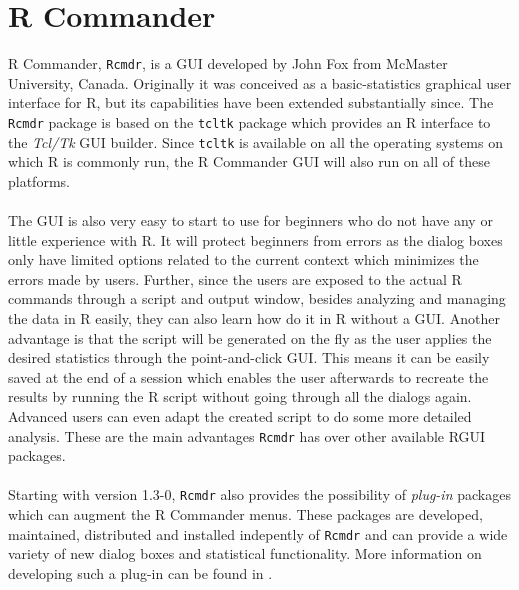 \documentclass[a4paper]{article}\usepackage[]{graphicx}\usepackage[]{color}
\begin{document}
\section{R Commander}

R Commander, \verb|Rcmdr|\citep{Fox2005}, is a GUI developed by John Fox from
McMaster University, Canada. Originally it was conceived as a basic-statistics graphical
user interface for R, but its capabilities have been extended substantially
since. The \verb|Rcmdr| package is based on the \verb|tcltk| package
\citep{Dalgaard2001} which provides an R interface to the {\it Tcl/Tk} GUI builder. 
Since \verb|tcltk| is available on all the operating systems on which R is
commonly run, the R Commander GUI will also run on all of these platforms.\\ \\
The GUI is also very easy to start to use for beginners who do not have any
or little experience with R. It will protect beginners from errors as the dialog
boxes only have limited options related to the current context which minimizes
the errors made by users. Further, since the users are exposed to the actual
R commands through a script and output window, besides analyzing and managing
the data in R easily, they can also learn how do it in R without a GUI.
Another advantage is that the script will be generated on the fly as the user
applies the desired statistics through the point-and-click GUI. This means it can be easily
saved at the end of a session which enables the user afterwards to recreate the
results by running the R script without going through all the dialogs again.
Advanced users can even adapt the created script to do some more detailed
analysis. These are the main advantages \verb|Rcmdr| has over other available
RGUI packages.\\ \\
Starting with version 1.3-0, \verb|Rcmdr| also provides the possibility of {\it
plug-in} packages which can augment the R Commander menus. These packages are
developed, maintained, distributed and installed indepently of \verb|Rcmdr| and
can provide a wide variety of new dialog boxes and statistical functionality.
More information on developing such a plug-in can be found in \citet{Fox2007}.\\
\end{document}
